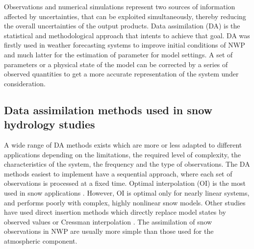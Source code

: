 \documentclass[utf8]{frontiersSCNS} %
\begin{document}
Observations and numerical simulations represent two sources of information affected by uncertainties, that can be exploited simultaneously, thereby reducing the overall uncertainties of the output products. 
Data assimilation (DA) is the statistical and methodological approach that intents to achieve that goal. 
DA was firstly used in weather forecasting systems to improve initial conditions of NWP and much latter for the estimation of parameter for model settings.
A set of parameters or a physical state of the model can be corrected by a series of observed quantities to get a more accurate representation of the system under consideration. 

\subsection{Data assimilation methods used in snow hydrology studies}


A wide range of DA methods exists which are more or less adapted to different applications depending on the limitations, the required level of complexity, the characteristics of the system, the frequency and the type of observations. 
The DA methods easiest to implement have a sequential approach, where each set of observations is processed at a fixed time. Optimal interpolation (OI) is the most used in snow applications \citep{Helmert_2018}. However, OI is optimal only for nearly linear systems, and performs poorly with complex, highly nonlinear snow models. 
Other studies have used direct insertion methods which directly replace model states by observed values \citep{Rodell_2004,Liston_1999,Malik_2012} or Cressman interpolation \citep{Cressman_1959,Drusch_2004,Dee_2011}. The assimilation of snow observations in NWP are usually more simple than those used for the atmospheric component.
\end{document}
